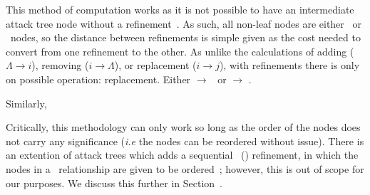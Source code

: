 This method of computation works as it is not possible to have an intermediate attack tree node without a refinement~\cite{mauw_foundations_2006}. As such, all non-leaf nodes are either \AND\ or \OR\ nodes, so the distance between refinements is simple given as the cost needed to convert from one refinement to the other. As unlike the calculations of adding ($\Lambda \rightarrow i$), removing ($i \rightarrow \Lambda$), or replacement ($i \rightarrow j$), with refinements there is only on possible operation: replacement. Either \AND $\rightarrow$ \OR\ or \OR $\rightarrow$ \AND.

Similarly, 

Critically, this methodology can only work so long as the order of the nodes does not carry any significance (\textit{i.e} the nodes can be reordered without issue). There is an extention of attack trees which adds a sequential \AND\ (\SAND) refinement, in which the nodes in a \SAND\ relationship are given to be ordered~\cite{jhawar_attack_2015}; however, this is out of scope for our purposes. We discuss this further in Section~.